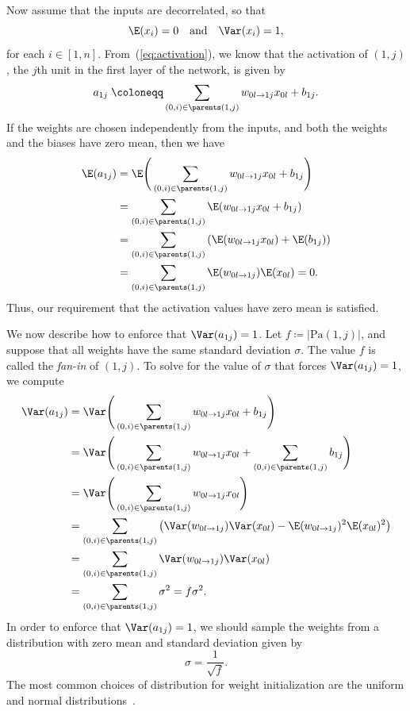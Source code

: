 \documentclass[11pt,a4paper]{article}
\numberwithin{equation}{section}
\newcommand{\weight}[2]{w_{#1 \rightarrow #2}}
\begin{document}
Now assume that the inputs are decorrelated, so that
\[
	\E(x_i) = 0 \quad\text{and}\quad \Var(x_i) = 1,
\]
for each $i \in [1, n]$. From~(\ref{eq:activation}), we know that the activation
of $(1, j)$, the $j$th unit in the first layer of the network, is given by
\[
	a_{1j} \;\coloneqq \sum_{(0, i) \in \parents(1, j)} \weight{0l}{1j} x_{0l} + b_{1j}.
\]
If the weights are chosen independently from the inputs, and both the weights
and the biases have zero mean, then we have
\begin{align*}
	\E(a_{1j})
	&= \E\Bigg(\sum_{(0, i) \in \parents(1, j)} \weight{0l}{1j} x_{0l} + b_{1j}\Bigg) \\
	&= \sum_{(0, i) \in \parents(1, j)} \E(\weight{0l}{1j} x_{0l} + b_{1j}) \\
	&= \sum_{(0, i) \in \parents(1, j)} \left(\E(\weight{0l}{1j} x_{0l}) + \E(b_{1j})\right) \\
	&= \sum_{(0, i) \in \parents(1, j)} \E(\weight{0l}{1j}) \E(x_{0l}) = 0.
\end{align*}
Thus, our requirement that the activation values have zero mean is satisfied.

We now describe how to enforce that $\Var(a_{1j}) = 1$. Let $f \coloneqq
|\text{Pa}(1, j)|$, and suppose that all weights have the same standard
deviation $\sigma$. The value $f$ is called the \emph{fan-in} of $(1, j)$. To
solve for the value of $\sigma$ that forces $\Var(a_{1j}) = 1$, we compute
\begin{align*}
	\Var(a_{1j})
	&= \Var\Bigg(\sum_{(0, i) \in \parents(1, j)} \weight{0l}{1j} x_{0l} + b_{1j}\Bigg) \\
	&= \Var\Bigg(
		\sum_{(0, i) \in \parents(1, j)} \weight{0l}{1j} x_{0l} +
		\sum_{(0, i) \in \parents(1, j)} b_{1j}
	\Bigg) \\
	&= \Var\Bigg(\sum_{(0, i) \in \parents(1, j)} \weight{0l}{1j} x_{0l}\Bigg)\\
	&= \sum_{(0, i) \in \parents(1, j)} \left(
		\Var(\weight{0l}{1j}) \Var(x_{0l}) -
		\E(\weight{0l}{1j})^2 \E(x_{0l})^2
	\right) \\
	&= \sum_{(0, i) \in \parents(1, j)} \Var(\weight{0l}{1j}) \Var(x_{0l}) \\
	&= \sum_{(0, i) \in \parents(1, j)} \sigma^2 = f \sigma^2.
\end{align*}
In order to enforce that $\Var(a_{1j}) = 1$, we should sample the weights from a
distribution with zero mean and standard deviation given by
\[
	\sigma = \frac{1}{\sqrt{f}}.
\]
The most common choices of distribution for weight initialization are the
uniform and normal distributions~\citep{lecun-98b, krizhevsky2012imagenet}.
\end{document}
